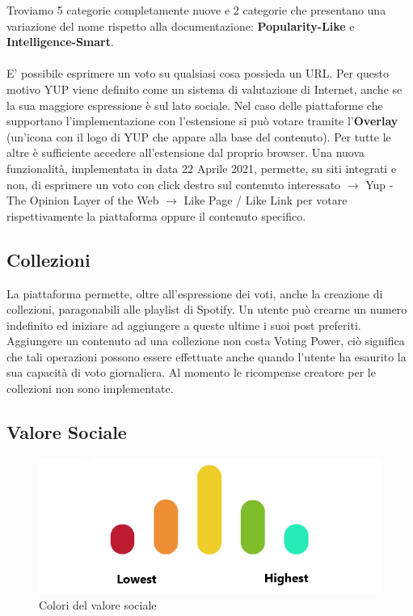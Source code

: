 Troviamo 5 categorie completamente nuove e 2 categorie che presentano una variazione del nome rispetto alla documentazione: \textbf{Popularity-Like} e \textbf{Intelligence-Smart}.
\\
\\
E' possibile esprimere un voto su qualsiasi cosa possieda un URL. Per questo motivo YUP viene definito come un sistema di valutazione di Internet, anche se la sua maggiore espressione è sul lato sociale. Nel caso delle piattaforme che supportano l'implementazione con l'estensione si può votare tramite l'\textbf{Overlay} (un'icona con il logo di YUP che appare alla base del contenuto). Per tutte le altre è sufficiente accedere all'estensione dal proprio browser. Una nuova funzionalità, implementata in data 22 Aprile 2021, permette, su siti integrati e non, di esprimere un voto con click destro sul contenuto interessato $\rightarrow$ Yup - The Opinion Layer of the Web $\rightarrow$ Like Page / Like Link per votare rispettivamente la piattaforma oppure il contenuto specifico.

\subsection{Collezioni}
La piattaforma permette, oltre all'espressione dei voti, anche la creazione di collezioni, paragonabili alle playlist di Spotify. Un utente può crearne un numero indefinito ed iniziare ad aggiungere a queste ultime i suoi post preferiti. Aggiungere un contenuto ad una collezione non costa Voting Power, ciò significa che tali operazioni possono essere effettuate anche quando l'utente ha esaurito la sua capacità di voto giornaliera. Al momento le ricompense creatore per le collezioni non sono implementate.

\subsection{Valore Sociale}

\begin{figure}[t]
    \centering
    \includegraphics[scale=0.8]{images/colors.png}
    \caption{Colori del valore sociale}
    \label{fig:colours}
\end{figure}

